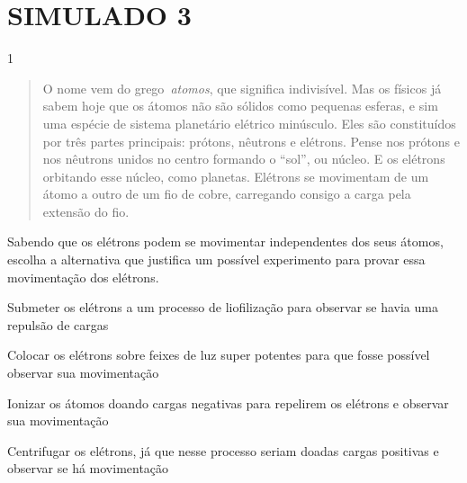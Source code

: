 {{\chapter{SIMULADO 3}

\num{1}
\begin{quote}
  O nome vem do grego~\emph{atomos}, que significa indivisível. Mas os
  físicos já sabem hoje que os átomos não são sólidos como pequenas
  esferas, e sim uma espécie de sistema planetário elétrico minúsculo.
  Eles são constituídos por três partes principais: prótons, nêutrons e
  elétrons. Pense nos prótons e nos nêutrons unidos no centro formando o
  ``sol'', ou núcleo. E os elétrons orbitando esse núcleo, como
  planetas. Elétrons se movimentam de um átomo a outro de um fio de
  cobre, carregando consigo a carga pela extensão do fio.

\end{quote}

Sabendo que os elétrons podem se movimentar independentes dos seus
átomos, escolha a alternativa que justifica um possível experimento para
provar essa movimentação dos elétrons.

\begin{escolha}
\item
  Submeter os elétrons a um processo de liofilização para observar se
  havia uma repulsão de cargas
\item
  Colocar os elétrons sobre feixes de luz super potentes para que fosse
  possível observar sua movimentação
\item
  Ionizar os átomos doando cargas negativas para repelirem os elétrons e
  observar sua movimentação
\item
  Centrifugar os elétrons, já que nesse processo seriam doadas cargas
  positivas e observar se há movimentação
\end{escolha}


}}
